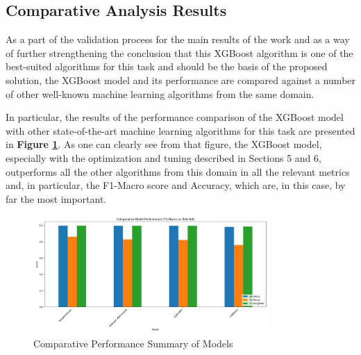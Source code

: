 \subsection{Comparative Analysis Results}

As a part of the validation process for the main results of the work and as a way of further strengthening the conclusion that this XGBoost algorithm is one of the best-suited algorithms for this task and should be the basis of the proposed solution, the XGBoost model and its performance are compared against a number of other well-known machine learning algorithms from the same domain.

In particular, the results of the performance comparison of the XGBoost model with other state-of-the-art machine learning algorithms for this task are presented in \textbf{Figure \ref{fig:comparative_performance_summary}}. As one can clearly see from that figure, the XGBoost model, especially with the optimization and tuning described in Sections 5 and 6, outperforms all the other algorithms from this domain in all the relevant metrics and, in particular, the F1-Macro score and Accuracy, which are, in this case, by far the most important.

\begin{figure}[H]
	\centering
	\includegraphics[width=0.8\textwidth]{assets/figures/results/comparative_performance_summary.png}
	\caption{Comparative Performance Summary of Models}
	\label{fig:comparative_performance_summary}
\end{figure}
